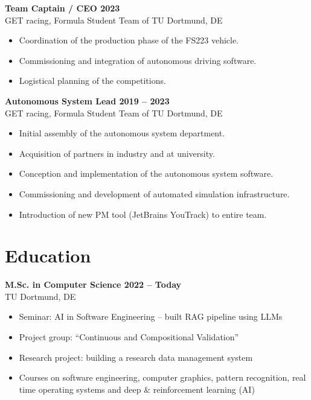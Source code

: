 \documentclass[a4paper,11pt]{article}
\newcommand{\subsectionskip}[0]{\vspace{0.125cm}}
\newcommand{\col}[2]{\textcolor[HTML]{#1}{#2}}
\begin{document}
\begin{minipage}[t]{0.65\textwidth}
    \subsectionskip

    \col{b38668}{\textbf{Team Captain / CEO \hfill 2023}} \\
    GET racing, Formula Student Team of TU Dortmund, DE
    \begin{itemize}
        \small
        \item Coordination of the production phase of the FS223 vehicle.
        \item Commissioning and integration of autonomous driving software.
        \item Logistical planning of the competitions.
    \end{itemize}

    \subsectionskip

    \textbf{\col{a68573}{Autonomous System Lead \hfill 2019 -- 2023}} \\
    GET racing, Formula Student Team of TU Dortmund, DE
    \begin{itemize}
        \small
        \item Initial assembly of the autonomous system department.
        \item Acquisition of partners in industry and at university.
        \item Conception and implementation of the autonomous system software.
        \item Commissioning and development of automated simulation infrastructure.
        \item Introduction of new PM tool (JetBrains YouTrack) to entire team.
    \end{itemize}

    \section*{\col{908587}{Education}}
    \col{91878a}{\textbf{M.Sc. in Computer Science \hfill 2022 -- Today}} \\
    TU Dortmund, DE
    \begin{itemize}
        \small
        \item Seminar: AI in Software Engineering -- built RAG pipeline using LLMs
        \item Project group: \enquote{Continuous and Compositional Validation}
        \item Research project: building a research data management system
        \item Courses on software engineering, computer graphics, pattern recognition, real time operating systems and deep \& reinforcement learning (AI)
    \end{itemize}


\end{minipage}
\end{document}
